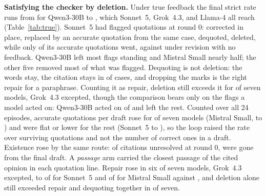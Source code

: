 \documentclass{IOS-Book-Article}
\begin{document}
\textbf{Satisfying the checker by deletion.} Under true feedback the final strict rate runs from \loopQwenTrueFinal{} for Qwen3-30B to \loopSonnetTrueFinal, which Sonnet~5, Grok~4.3, and Llama-4 all reach (Table~\ref{tab:true}). Sonnet~5 had \trFlagRZeroSonnet{} flagged quotations at round 0: \trTrueFlagToAccSonnet{} corrected in place, \trTrueFlagReplacedSonnet{} replaced by an accurate quotation from the same case, \trTrueFlagDequotedSonnet{} dequoted, \trTrueFlagDeletedSonnet{} deleted, while only \trTrueAccRemovedSonnet{} of its \trAccRZeroSonnet{} accurate quotations went, against \trNoneAccRemovedSonnet{} under revision with no feedback. Qwen3-30B left most flags standing and Mistral Small nearly half; the other five removed most of what was flagged. Dequoting is not deletion: the words stay, the citation stays in \deqCitedTrue{} of \deqTotalTrue{} cases, and dropping the marks is the right repair for a paraphrase. Counting it as repair, deletion still exceeds it for \deleteBeatsKeepTrue{} of seven models, Grok~4.3 excepted, though the comparison bears only on the flags a model acted on: Qwen3-30B acted on \trActedQwenTrue{} of \trFlagRZeroQwen{} and left the rest. Counted over all 24 episodes, accurate quotations per draft rose for \ittTrueRisers{} of seven models (Mistral Small, \ittMistralTrueStart{} to \ittMistralTrueFinal) and were flat or lower for the rest (Sonnet~5 \ittSonnetTrueStart{} to \ittSonnetTrueFinal), so the loop raised the rate over surviving quotations and not the number of correct ones in a draft. Existence rose by the same route: of \lcNfRZeroTotal{} citations unresolved at round 0, \lcNfRemovedTotal{} were gone from the final draft. A \textit{passage} arm carried the closest passage of the cited opinion in each quotation line. Repair rose in six of seven models, Grok~4.3 excepted, to \trPassageFlagRepairedSonnet{} of \trFlagRZeroSonnet{} for Sonnet~5 and \trPassageFlagRepairedMistral{} of \trFlagRZeroMistral{} for Mistral Small against \trTrueFlagRepairedMistral, and deletion alone still exceeded repair and dequoting together in \deleteBeatsKeepPassage{} of seven.
\end{document}
